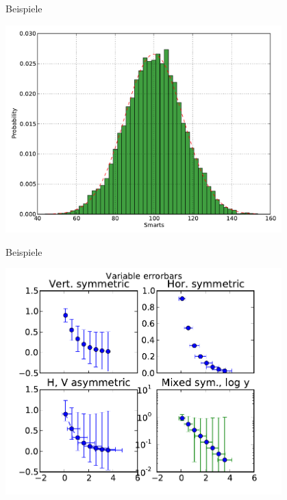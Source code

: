 \begin{frame}{Beispiele}
  \begin{center}
    \includegraphics[width=0.8\textwidth]{img/matplotlib/hist.pdf}
  \end{center}
\end{frame}

\begin{frame}{Beispiele}
  \begin{center}
    \includegraphics[width=0.8\textwidth]{img/matplotlib/errorbars.pdf}
  \end{center}
\end{frame}

